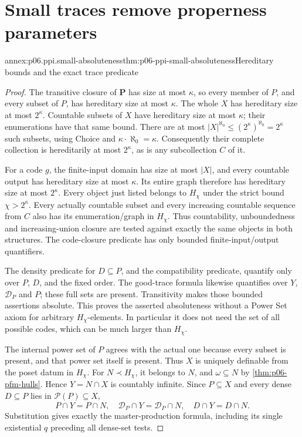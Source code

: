 \section{Small traces remove properness parameters}
\label{annex:p06-properness-parameter-invariance}

\begin{annexitem}{annex:p06.ppi.small-absoluteness}{thm:p06-ppi-small-absoluteness}{Hereditary bounds and the exact trace predicate}
\begin{proof}
The transitive closure of \(\mathbf P\) has size at most \(\kappa\),
so every member of \(P\), and every subset of \(P\), has hereditary
size at most \(\kappa\). The whole \(X\) has hereditary size at most
\(2^\kappa\). Countable subsets of \(X\) have hereditary size at most
\(\kappa\); their enumerations have that same bound. There are at
most \(|X|^{\aleph_0}\leq(2^\kappa)^{\aleph_0}=2^\kappa\) such
subsets, using Choice and \(\kappa\cdot\aleph_0=\kappa\).
Consequently their complete collection is hereditarily at most
\(2^\kappa\), as is any subcollection \(C\) of it.

For a code \(g\), the finite-input domain has size at most \(|X|\),
and every countable output has hereditary size at most \(\kappa\).
Its entire graph therefore has hereditary size at most \(2^\kappa\).
Every object just listed belongs to \(H_\chi\) under the strict bound
\(\chi>2^\kappa\). Every actually countable subset and every increasing
countable sequence from \(C\) also has its enumeration/graph in
\(H_\chi\). Thus countability, unboundedness and increasing-union
closure are tested against exactly the same objects in both structures.
The code-closure predicate has only bounded finite-input/output quantifiers.

The density predicate for \(D\subseteq P\), and the compatibility
predicate, quantify only over \(P\), \(D\), and the fixed order.
The good-trace formula likewise quantifies over \(Y\), \(\mathcal D_P\)
and \(P\); these full sets are present. Transitivity makes those
bounded assertions absolute. This proves the asserted absoluteness
without a Power Set axiom for arbitrary \(H_\chi\)-elements.
In particular it does not need the set of all possible codes, which
can be much larger than \(H_\chi\).

The internal power set of \(P\) agrees with the actual one because
every subset is present, and that power set itself is present. Thus
\(X\) is uniquely definable from the poset datum in \(H_\chi\).
For \(N\prec H_\chi\), it belongs to \(N\), and
\(\omega\subseteq N\) by \cref{thm:p06-pfm-hulls}. Hence
\(Y=N\cap X\) is countably infinite. Since \(P\subseteq X\) and
every dense \(D\subseteq P\) lies in \(\mathcal P(P)\subseteq X\),
\[
 P\cap Y=P\cap N,\quad \mathcal D_P\cap Y=\mathcal D_P\cap N,
 \quad D\cap Y=D\cap N.
\]
Substitution gives exactly the master-production formula, including
its single existential \(q\) preceding all dense-set tests.
\end{proof}
\end{annexitem}

